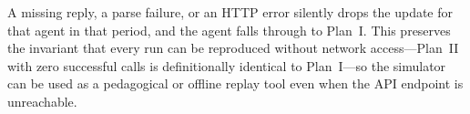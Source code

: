 A missing reply, a parse failure, or an HTTP error silently drops
the update for that agent in that period, and the agent falls
through to Plan~I. This preserves the invariant that every run can
be reproduced without network access---Plan~II with zero successful
calls is definitionally identical to Plan~I---so the simulator can
be used as a pedagogical or offline replay tool even when the API
endpoint is unreachable.
